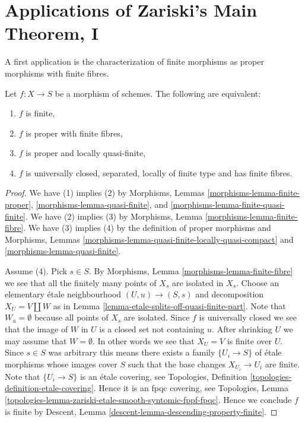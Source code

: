 \section{Applications of Zariski's Main Theorem, I}
\label{section-applications-zmt}

\noindent
A first application is the characterization of finite
morphisms as proper morphisms with finite fibres.

\begin{lemma}
\label{lemma-characterize-finite}
Let $f : X \to S$ be a morphism of schemes.
The following are equivalent:
\begin{enumerate}
\item $f$ is finite,
\item $f$ is proper with finite fibres,
\item $f$ is proper and locally quasi-finite,
\item $f$ is universally closed, separated, locally of finite type
and has finite fibres.
\end{enumerate}
\end{lemma}

\begin{proof}
We have (1) implies (2) by
Morphisms, Lemmas \ref{morphisms-lemma-finite-proper},
\ref{morphisms-lemma-quasi-finite},
and \ref{morphisms-lemma-finite-quasi-finite}.
We have (2) implies (3) by Morphisms, Lemma \ref{morphisms-lemma-finite-fibre}.
We have (3) implies (4) by the definition of proper morphisms and
Morphisms, Lemmas \ref{morphisms-lemma-quasi-finite-locally-quasi-compact} and
\ref{morphisms-lemma-quasi-finite}.

\medskip\noindent
Assume (4). Pick $s \in S$. By
Morphisms, Lemma \ref{morphisms-lemma-finite-fibre} we
see that all the finitely many points of $X_s$ are isolated in $X_s$.
Choose an elementary \'etale neighbourhood $(U, u) \to (S, s)$
and decomposition $X_U = V \amalg W$ as in
Lemma \ref{lemma-etale-splits-off-quasi-finite-part}.
Note that $W_u = \emptyset$ because all points of $X_s$ are isolated.
Since $f$ is universally closed we see that
the image of $W$ in $U$ is a closed set not containing $u$.
After shrinking $U$ we may assume that $W = \emptyset$.
In other words we see that $X_U = V$ is finite over $U$.
Since $s \in S$ was arbitrary
this means there exists a family $\{U_i \to S\}$
of \'etale morphisms whose images cover $S$ such that
the base changes $X_{U_i} \to U_i$ are finite.
Note that $\{U_i \to S\}$ is an \'etale covering,
see Topologies, Definition \ref{topologies-definition-etale-covering}.
Hence it is an fpqc covering, see
Topologies,
Lemma \ref{topologies-lemma-zariski-etale-smooth-syntomic-fppf-fpqc}.
Hence we conclude $f$ is finite by
Descent, Lemma \ref{descent-lemma-descending-property-finite}.
\end{proof}

